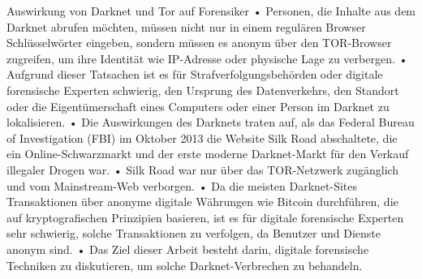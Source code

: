 Auswirkung von Darknet und Tor auf Forensiker \cite{Rathod.2017}
	•	Personen, die Inhalte aus dem Darknet abrufen möchten, müssen nicht nur in einem regulären Browser Schlüsselwörter eingeben, sondern müssen es anonym über den TOR-Browser zugreifen, um ihre Identität wie IP-Adresse oder physische Lage zu verbergen.
	•	Aufgrund dieser Tatsachen ist es für Strafverfolgungsbehörden oder digitale forensische Experten schwierig, den Ursprung des Datenverkehrs, den Standort oder die Eigentümerschaft eines Computers oder einer Person im Darknet zu lokalisieren.
	•	Die Auswirkungen des Darknets traten auf, als das Federal Bureau of Investigation (FBI) im Oktober 2013 die Website Silk Road abschaltete, die ein Online-Schwarzmarkt und der erste moderne Darknet-Markt für den Verkauf illegaler Drogen war.
	•	Silk Road war nur über das TOR-Netzwerk zugänglich und vom Mainstream-Web verborgen.
	•	Da die meisten Darknet-Sites Transaktionen über anonyme digitale Währungen wie Bitcoin durchführen, die auf kryptografischen Prinzipien basieren, ist es für digitale forensische Experten sehr schwierig, solche Transaktionen zu verfolgen, da Benutzer und Dienste anonym sind.
	•	Das Ziel dieser Arbeit besteht darin, digitale forensische Techniken zu diskutieren, um solche Darknet-Verbrechen zu behandeln.




